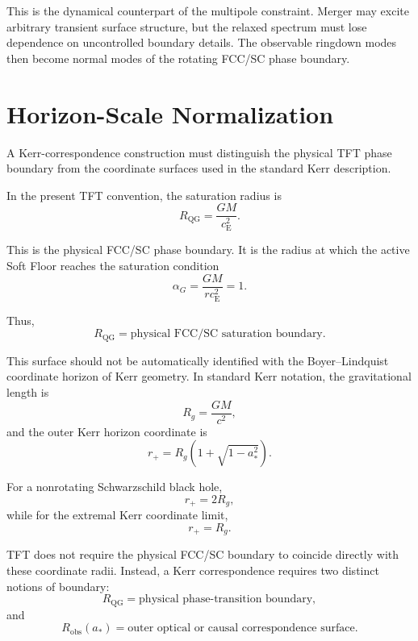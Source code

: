 This is the dynamical counterpart of the multipole constraint. Merger may excite arbitrary transient surface structure, but the relaxed spectrum must lose dependence on uncontrolled boundary details. The observable ringdown modes then become normal modes of the rotating FCC/SC phase boundary.

\section{Horizon-Scale Normalization}

A Kerr-correspondence construction must distinguish the physical TFT phase boundary from the coordinate surfaces used in the standard Kerr description.

In the present TFT convention, the saturation radius is
\begin{equation}
    R_{\mathrm{QG}}
    =
    \frac{GM}{c_{\mathrm{E}}^2}.
\end{equation}

This is the physical FCC/SC phase boundary. It is the radius at which the active Soft Floor reaches the saturation condition
\begin{equation}
    \alpha_G
    =
    \frac{GM}{r c_{\mathrm{E}}^2}
    =
    1.
\end{equation}

Thus,
\begin{equation}
    R_{\mathrm{QG}}
    =
    \text{physical FCC/SC saturation boundary}.
\end{equation}

This surface should not be automatically identified with the Boyer--Lindquist coordinate horizon of Kerr geometry. In standard Kerr notation, the gravitational length is
\begin{equation}
    R_g
    =
    \frac{GM}{c^2},
\end{equation}
and the outer Kerr horizon coordinate is
\begin{equation}
    r_+
    =
    R_g
    \left(
    1+\sqrt{1-a_\ast^2}
    \right).
\end{equation}

For a nonrotating Schwarzschild black hole,
\begin{equation}
    r_+
    =
    2R_g,
\end{equation}
while for the extremal Kerr coordinate limit,
\begin{equation}
    r_+
    =
    R_g.
\end{equation}

TFT does not require the physical FCC/SC boundary to coincide directly with these coordinate radii. Instead, a Kerr correspondence requires two distinct notions of boundary:
\begin{equation}
    R_{\mathrm{QG}}
    =
    \text{physical phase-transition boundary},
\end{equation}
and
\begin{equation}
    R_{\mathrm{obs}}(a_\ast)
    =
    \text{outer optical or causal correspondence surface}.
\end{equation}


